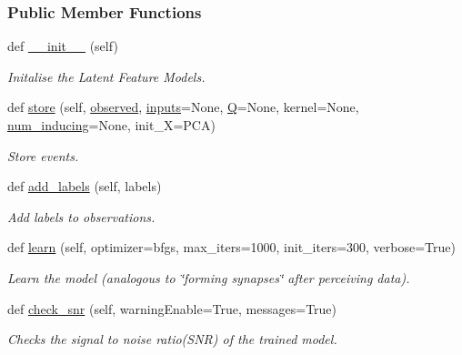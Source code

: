 \subsubsection*{Public Member Functions}
\begin{DoxyCompactItemize}
\item 
def \hyperlink{group__icubclient__SAM__Core_ac5a497600911dabbeec52f47198662ce}{\+\_\+\+\_\+init\+\_\+\+\_\+} (self)
\begin{DoxyCompactList}\small\item\em Initalise the Latent Feature Models. \end{DoxyCompactList}\item 
def \hyperlink{group__icubclient__SAM__Core_aa7ce30e03fc75b4d5b5a49a6ee8c288f}{store} (self, \hyperlink{group__icubclient__SAM__Core_ace2526a537a5af0d3609a022f32d380b}{observed}, \hyperlink{group__icubclient__SAM__Core_a35c00c5bc74b2ff0d93868b9f6d9b888}{inputs}=None, \hyperlink{group__icubclient__SAM__Core_adc719c2f2f24d23fb8dc2368c711d6b2}{Q}=None, kernel=None, \hyperlink{group__icubclient__SAM__Core_addd9a08eac90755cd3d4d3cf173ebcdf}{num\+\_\+inducing}=None, init\+\_\+X=\textquotesingle{}P\+CA\textquotesingle{})
\begin{DoxyCompactList}\small\item\em Store events. \end{DoxyCompactList}\item 
def \hyperlink{group__icubclient__SAM__Core_a679cfd0b1085a4acc55efa2f5651ef39}{add\+\_\+labels} (self, labels)
\begin{DoxyCompactList}\small\item\em Add labels to observations. \end{DoxyCompactList}\item 
def \hyperlink{group__icubclient__SAM__Core_aec85189808d132eab55a5230f595051d}{learn} (self, optimizer=\textquotesingle{}bfgs\textquotesingle{}, max\+\_\+iters=1000, init\+\_\+iters=300, verbose=True)
\begin{DoxyCompactList}\small\item\em Learn the model (analogous to \char`\"{}forming synapses\char`\"{} after perceiving data). \end{DoxyCompactList}\item 
def \hyperlink{group__icubclient__SAM__Core_a45d705cd21e288151677a313f1f35418}{check\+\_\+snr} (self, warning\+Enable=True, messages=True)
\begin{DoxyCompactList}\small\item\em Checks the signal to noise ratio(\+S\+N\+R) of the trained model. \end{DoxyCompactList}\item 

\end{DoxyCompactItemize}
